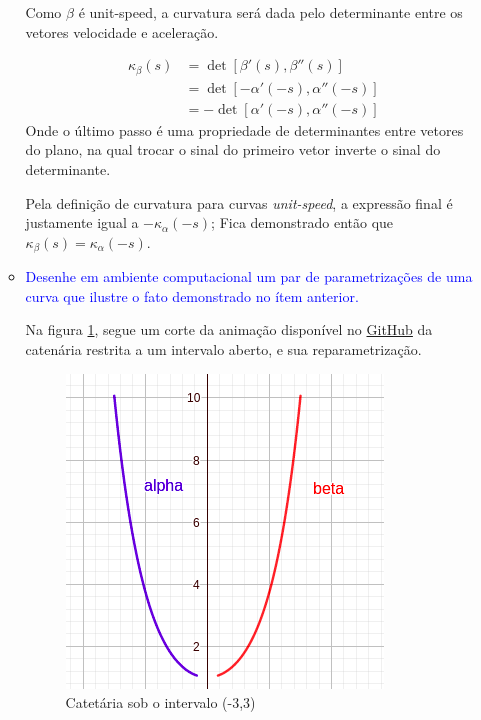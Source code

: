 \documentclass[12pt,letterpaper]{article}
\begin{document}
\begin{enumerate}
\begin{itemize}
		Como $\beta$ é unit-speed, a curvatura será dada pelo determinante entre os vetores velocidade e aceleração.
		
		\begin{align*}
			\kappa_{\beta}(s)&=\det[\beta'(s),\beta''(s)]\\
			&=\det[-\alpha'(-s),\alpha''(-s)]\\
			&=-\det[\alpha'(-s),\alpha''(-s)]
			\end{align*}
		Onde o último passo é uma propriedade de determinantes entre vetores do plano, na qual trocar o sinal do primeiro vetor inverte o sinal do determinante.
		
		Pela definição de curvatura para curvas \textit{unit-speed}, a expressão final é justamente igual a $-\kappa_{\alpha}(-s)$; Fica demonstrado então que $\kappa_{\beta}(s)=\kappa_{\alpha}(-s)$.
		
		\item \textcolor{blue}{Desenhe em ambiente computacional um par de parametrizações de uma curva que ilustre o fato demonstrado no ítem anterior.}
		
		Na figura \ref{ex3}, segue um corte da animação disponível no \href{https://github.com/reneroliveira/Curves_and_Surfaces/blob/main/ggb_files/L3_ex3.ggb}{GitHub} da catenária restrita a um intervalo aberto, e sua reparametrização.
		
		\begin{figure}
			\centering
			\includegraphics[scale=0.7]{../images/L3_ex3.png}
			\caption{Catetária sob o intervalo (-3,3)}
			\label{ex3}
		\end{figure}
		
		\end{itemize}
		
		
		
		
	\end{enumerate}
	
	\newpage
	
	
	
\end{document}
